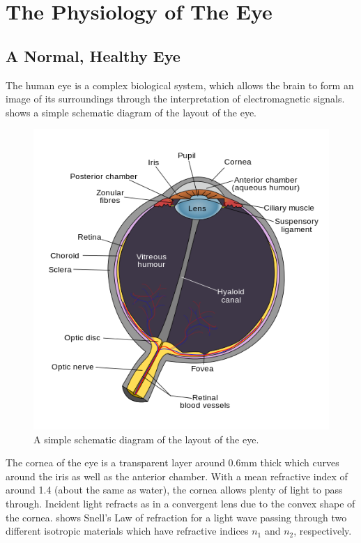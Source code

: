 
\chapter{The Physiology of The Eye}

\label{anatomy}
\section{A Normal, Healthy Eye}

The human eye is a complex biological system, which allows the brain to
form an image of its surroundings through the interpretation of
electromagnetic signals.  shows a simple schematic
diagram of the layout of the eye. 

\begin{figure}[!htbp]
 \centering
   \includegraphics{figures/schematic_diagram_of_the_human_eye}
 \caption{A simple schematic diagram of the layout of the eye.\cite{wikiRhcastilhos}}
 \label{fig:eye_simple}
\end{figure}

The cornea of the eye is a transparent layer around 0.6mm thick
which curves around the iris as well as the anterior
chamber.\cite{yaylali1997corneal,thoft1983x,patel1994refractive}
With a mean refractive index of around 1.4 (about the same as water),
the cornea allows plenty of light to pass through. Incident light refracts as in a
convergent lens due to the convex shape of the cornea.   shows
Snell's Law of refraction for a light wave passing through two
different isotropic materials which have refractive indices $n_1$
and $n_2$, respectively.


